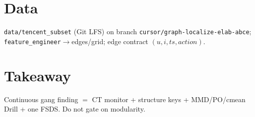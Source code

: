 \documentclass[11pt]{article}
\begin{document}
\section{Data}
\texttt{data/tencent\_subset} (Git LFS) on branch
\texttt{cursor/graph-localize-elab-abce};
\texttt{feature\_engineer}$\to$edges/grid;
edge contract $(u,i,ts,action)$.

\section{Takeaway}
Continuous gang finding $=$ CT monitor + structure keys +
MMD/PO/cmean Drill + one FSDS. Do not gate on modularity.
\end{document}
